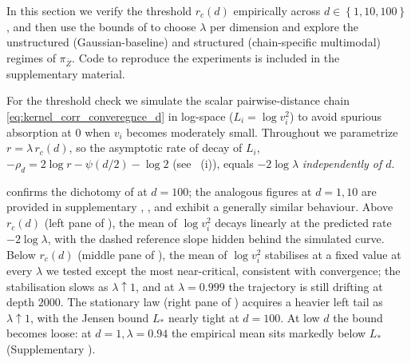 \documentclass{article}
\newcommand{\Set}[1]{\left\{ #1 \right\}}
\newcommand{\bZ}{\bar{Z}}
\begin{document}
In this section we verify the threshold $r_c(d)$ empirically across $d \in \Set{1, 10, 100}$, and then use the bounds of  to choose $\lambda$ per dimension and explore the unstructured (Gaussian-baseline) and structured (chain-specific multimodal) regimes of $\pi_{\bZ}$. Code to reproduce the experiments is included in the supplementary material.

For the threshold check we simulate the scalar pairwise-distance chain \eqref{eq:kernel_corr_converegnce_d} in log-space ($L_i = \log v_i^2$) to avoid spurious absorption at $0$ when $v_i$ becomes moderately small. Throughout we parametrize $r = \lambda\, r_c(d)$, so the asymptotic rate of decay of $L_i$, $-\rho_d = 2\log r - \psi(d/2) - \log 2$ (see ~(i)), equals $-2\log\lambda$ \emph{independently of $d$}.

 confirms the dichotomy of  at $d = 100$; the analogous figures at $d = 1, 10$ are provided in supplementary , , and exhibit a generally similar behaviour. Above $r_c(d)$ (left pane of ), the mean of $\log v_i^2$ decays linearly at the predicted rate $-2\log\lambda$, with the dashed reference slope hidden behind the simulated curve. Below $r_c(d)$ (middle pane of ), the mean of $\log v_i^2$ stabilises at a fixed value at every $\lambda$ we tested except the most near-critical, consistent with convergence; the stabilisation slows as $\lambda \uparrow 1$, and at $\lambda = 0.999$ the trajectory is still drifting at depth $2000$. The stationary law (right pane of ) acquires a heavier left tail as $\lambda \uparrow 1$, with the Jensen bound $L_*$ nearly tight at $d = 100$. At low $d$ the bound becomes loose: at $d = 1, \lambda = 0.94$ the empirical mean sits markedly below $L_*$ (Supplementary ).
\end{document}
